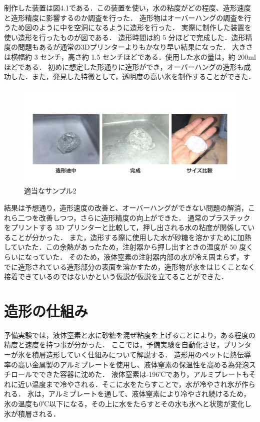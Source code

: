 制作した装置は図4.1である．この装置を使い，水の粘度がどの程度、造形速度と造形精度に影響するのか調査を行った．
造形物はオーバーハングの調査を行うため図のように中を空洞になるように造形を行った． 実際に制作した装置を使い造形を行ったものが図である．
造形時間は約 5 分ほどで完成した．造形精度の問題もあるが通常の3Dプリンターよりもかなり早い結果になった．
大きさは横幅約 3 センチ，高さ約 1.5 センチほどである．使用した水の量は，約 200ml ほどである．
初めに想定した形通りに造形ができ，オーバーハングの造形も成功した．また，発見した特徴として，透明度の高い氷を制作することができた．

\begin{figure}[H]
  \centering
  \includegraphics[width=14truecm]{./fig/yobi.jpg}
  \caption{適当なサンプル2}
  \label{fig:yobikekka}
\end{figure}

結果は予想通り，造形速度の改善と、オーバーハングができない問題の解消，これら二つを改善しつつ，さらに造形精度の向上ができた．
通常のプラスチックをプリントする 3D プリンターと比較して，押し出される水の粘度が関係していることが分かった．
また，造形する際に使用した水が砂糖を溶かすために加熱していたた．この余熱があったため，注射器から押し出すときの温度が 50 度くらいになっていた．
そのため，液体窒素の注射器内部の水が冷え固まらず，すでに造形されている造形部分の表面を溶かすため，造形物が水をはじくことなく接着できているのではないかという仮説が仮説を立てることができた．



\section{造形の仕組み}
\label{sec:paragraph}
予備実験では，液体窒素と水に砂糖を混ぜ粘度を上げることにより，ある程度の精度と速度を持つ事が分かった．
ここでは，予備実験を自動化させ，プリンターが氷を積層造形していく仕組みについて解説する．
造形用のペットに熱伝導率の高い金属製のアルミプレートを使用し、液体窒素の保温性を高める為発泡スチロールでできた容器に沈めた．
液体窒素は-196℃であり，アルミプレートもそれに近い温度まで冷やされる．そこに水をたらすことで，水が冷やされ氷が作られる．
氷は，アルミプレートを通して、液体窒素により冷やされ続けるため，氷の温度も0℃以下になる，その上に水をたらすとその水も氷へと状態が変化し氷が積層される．


